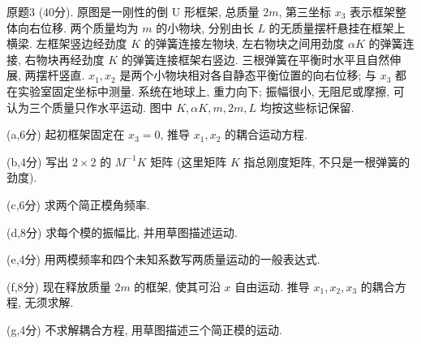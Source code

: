 \begin{exercise}\label{exam:actual1.3}
原题3 (40分). 原图是一刚性的倒 U 形框架, 总质量 $2m$, 第三坐标 $x_3$ 表示框架整体向右位移. 两个质量均为 $m$ 的小物块, 分别由长 $L$ 的无质量摆杆悬挂在框架上横梁. 左框架竖边经劲度 $K$ 的弹簧连接左物块, 左右物块之间用劲度 $\alpha K$ 的弹簧连接, 右物块再经劲度 $K$ 的弹簧连接框架右竖边. 三根弹簧在平衡时水平且自然伸展, 两摆杆竖直. $x_1,x_2$ 是两个小物块相对各自静态平衡位置的向右位移; 与 $x_3$ 都在实验室固定坐标中测量. 系统在地球上, 重力向下; 振幅很小, 无阻尼或摩擦, 可认为三个质量只作水平运动. 图中 $K,\alpha K,m,2m,L$ 均按这些标记保留.

(a,6分) 起初框架固定在 $x_3=0$, 推导 $x_1,x_2$ 的耦合运动方程.

(b,4分) 写出 $2\times2$ 的 $M^{-1}K$ 矩阵 (这里矩阵 $K$ 指总刚度矩阵, 不只是一根弹簧的劲度).

(c,6分) 求两个简正模角频率.

(d,8分) 求每个模的振幅比, 并用草图描述运动.

(e,4分) 用两模频率和四个未知系数写两质量运动的一般表达式.

(f,8分) 现在释放质量 $2m$ 的框架, 使其可沿 $x$ 自由运动. 推导 $x_1,x_2,x_3$ 的耦合方程, 无须求解.

(g,4分) 不求解耦合方程, 用草图描述三个简正模的运动.
\end{exercise}
